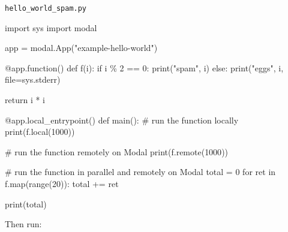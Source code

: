 \documentclass[
  letterpaper,
  DIV=11,
  numbers=noendperiod]{scrreprt}
\newenvironment{Shaded}{\begin{snugshade}}{\end{snugshade}}
\newcommand{\AttributeTok}[1]{\textcolor[rgb]{0.40,0.45,0.13}{#1}}
\newcommand{\BuiltInTok}[1]{\textcolor[rgb]{0.00,0.23,0.31}{#1}}
\newcommand{\CommentTok}[1]{\textcolor[rgb]{0.37,0.37,0.37}{#1}}
\newcommand{\ControlFlowTok}[1]{\textcolor[rgb]{0.00,0.23,0.31}{#1}}
\newcommand{\DecValTok}[1]{\textcolor[rgb]{0.68,0.00,0.00}{#1}}
\newcommand{\ImportTok}[1]{\textcolor[rgb]{0.00,0.46,0.62}{#1}}
\newcommand{\KeywordTok}[1]{\textcolor[rgb]{0.00,0.23,0.31}{#1}}
\newcommand{\NormalTok}[1]{\textcolor[rgb]{0.00,0.23,0.31}{#1}}
\newcommand{\OperatorTok}[1]{\textcolor[rgb]{0.37,0.37,0.37}{#1}}
\newcommand{\StringTok}[1]{\textcolor[rgb]{0.13,0.47,0.30}{#1}}
\begin{document}
\begin{codelisting}

\caption{\texttt{hello_world_spam.py}}

\begin{Shaded}
\begin{Highlighting}[]
\ImportTok{import}\NormalTok{ sys}
\ImportTok{import}\NormalTok{ modal}

\NormalTok{app }\OperatorTok{=}\NormalTok{ modal.App(}\StringTok{"example{-}hello{-}world"}\NormalTok{)}

\AttributeTok{@app.function}\NormalTok{()}
\KeywordTok{def}\NormalTok{ f(i):}
    \ControlFlowTok{if}\NormalTok{ i }\OperatorTok{\%} \DecValTok{2} \OperatorTok{==} \DecValTok{0}\NormalTok{:}
        \BuiltInTok{print}\NormalTok{(}\StringTok{"spam"}\NormalTok{, i)}
    \ControlFlowTok{else}\NormalTok{:}
        \BuiltInTok{print}\NormalTok{(}\StringTok{"eggs"}\NormalTok{, i, }\BuiltInTok{file}\OperatorTok{=}\NormalTok{sys.stderr)}

    \ControlFlowTok{return}\NormalTok{ i }\OperatorTok{*}\NormalTok{ i}

\AttributeTok{@app.local\_entrypoint}\NormalTok{()}
\KeywordTok{def}\NormalTok{ main():}
    \CommentTok{\# run the function locally}
    \BuiltInTok{print}\NormalTok{(f.local(}\DecValTok{1000}\NormalTok{))}

    \CommentTok{\# run the function remotely on Modal}
    \BuiltInTok{print}\NormalTok{(f.remote(}\DecValTok{1000}\NormalTok{))}

    \CommentTok{\# run the function in parallel and remotely on Modal}
\NormalTok{    total }\OperatorTok{=} \DecValTok{0}
    \ControlFlowTok{for}\NormalTok{ ret }\KeywordTok{in}\NormalTok{ f.}\BuiltInTok{map}\NormalTok{(}\BuiltInTok{range}\NormalTok{(}\DecValTok{20}\NormalTok{)):}
\NormalTok{        total }\OperatorTok{+=}\NormalTok{ ret}

    \BuiltInTok{print}\NormalTok{(total)}
\end{Highlighting}
\end{Shaded}

\end{codelisting}

Then run:
\end{document}
